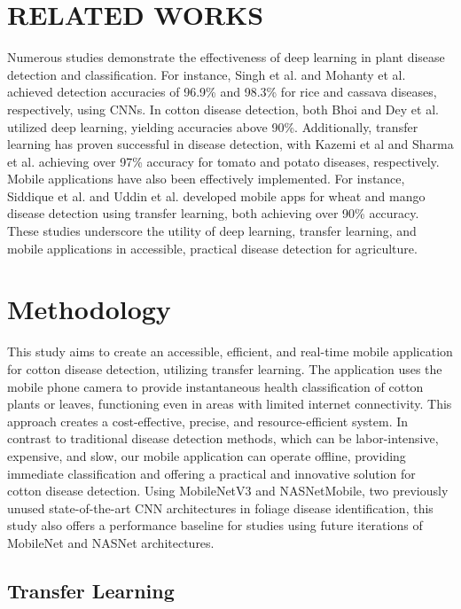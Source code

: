\documentclass[conference]{IEEEtran}
\begin{document}
\section{RELATED WORKS}

Numerous studies demonstrate the effectiveness of deep learning in plant disease detection and classification. For instance, Singh et al. \cite{Singh-etal} and Mohanty et al. \cite{Mohanty-etal} achieved detection accuracies of 96.9\% and 98.3\% for rice and cassava diseases, respectively, using CNNs. In cotton disease detection, both Bhoi \cite{Bhoi} and Dey et al.\cite{Dey-etal} utilized deep learning, yielding accuracies above 90\%. Additionally, transfer learning has proven successful in disease detection, with Kazemi et al\cite{Kazemi-etal} and Sharma et al.\cite{Sharma-etal} achieving over 97\% accuracy for tomato and potato diseases, respectively. Mobile applications have also been effectively implemented. For instance, Siddique et al.\cite{Siddique-etal} and Uddin et al.\cite{Uddin-etal} developed mobile apps for wheat and mango disease detection using transfer learning, both achieving over 90\% accuracy. These studies underscore the utility of deep learning, transfer learning, and mobile applications in accessible, practical disease detection for agriculture.

\section{Methodology}

This study aims to create an accessible, efficient, and real-time mobile application for cotton disease detection, utilizing transfer learning. The application uses the mobile phone camera to provide instantaneous health classification of cotton plants or leaves, functioning even in areas with limited internet connectivity. This approach creates a cost-effective, precise, and resource-efficient system. In contrast to traditional disease detection methods, which can be labor-intensive, expensive, and slow, our mobile application can operate offline, providing immediate classification and offering a practical and innovative solution for cotton disease detection. Using MobileNetV3 and NASNetMobile, two previously unused state-of-the-art CNN architectures in foliage disease identification, this study also offers a performance baseline for studies using future iterations of MobileNet and NASNet architectures. 

\subsection{Transfer Learning}
\end{document}
